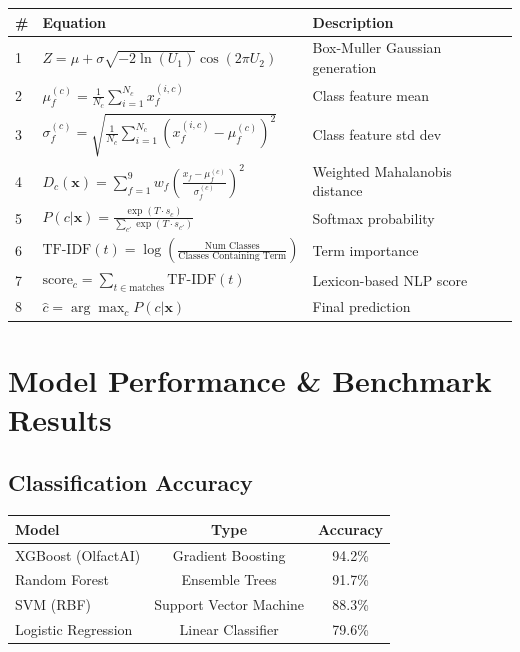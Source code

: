 \documentclass[10pt]{article}
\begin{document}
\begin{table}[ht]
\centering
\small
\begin{tabular}{|l|l|p{7cm}|}
\hline
\textbf{\#} & \textbf{Equation} & \textbf{Description} \\
\hline
1 & $Z = \mu + \sigma \sqrt{-2\ln(U_1)} \cos(2\pi U_2)$ & Box-Muller Gaussian generation \\
2 & $\mu_f^{(c)} = \frac{1}{N_c}\sum_{i=1}^{N_c} x_f^{(i,c)}$ & Class feature mean \\
3 & $\sigma_f^{(c)} = \sqrt{\frac{1}{N_c}\sum_{i=1}^{N_c}(x_f^{(i,c)}-\mu_f^{(c)})^2}$ & Class feature std dev \\
4 & $D_c(\mathbf{x}) = \sum_{f=1}^{9} w_f \left(\frac{x_f - \mu_f^{(c)}}{\sigma_f^{(c)}}\right)^2$ & Weighted Mahalanobis distance \\
5 & $P(c|\mathbf{x}) = \frac{\exp(T \cdot s_c)}{\sum_{c'}\exp(T \cdot s_{c'})}$ & Softmax probability \\
6 & $\text{TF-IDF}(t) = \log\left(\frac{\text{Num Classes}}{\text{Classes Containing Term}}\right)$ & Term importance \\
7 & $\text{score}_c = \sum_{t \in \text{matches}} \text{TF-IDF}(t)$ & Lexicon-based NLP score \\
8 & $\hat{c} = \arg\max_c P(c|\mathbf{x})$ & Final prediction \\
\hline
\end{tabular}
\end{table}


\section{Model Performance \& Benchmark Results}

\subsection{Classification Accuracy}

\begin{table}[ht]
\centering
\begin{tabular}{|l|c|c|}
\hline
\textbf{Model} & \textbf{Type} & \textbf{Accuracy} \\
\hline
XGBoost (OlfactAI) & Gradient Boosting & 94.2\% \\
Random Forest & Ensemble Trees & 91.7\% \\
SVM (RBF) & Support Vector Machine & 88.3\% \\
Logistic Regression & Linear Classifier & 79.6\% \\
\hline
\end{tabular}
\end{table}
\end{document}
